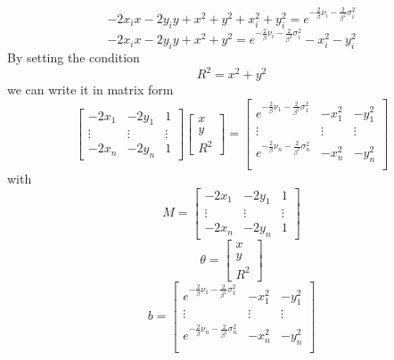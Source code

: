 \documentclass[12pt,twoside]{report}
\begin{document}
\begin{equation}
    -2x_ix-2y_iy+x^2+y^2+x_i^2+y_i^2=e^{-\frac{2}{\beta}\nu_i-\frac{2}{\beta^2}\sigma^2_i}
\end{equation}
\begin{equation}
    -2x_ix-2y_iy+x^2+y^2=e^{-\frac{2}{\beta}\nu_i-\frac{2}{\beta^2}\sigma^2_i}-x_i^2-y_i^2
\end{equation}
By setting the condition 
\begin{equation}
R^2=x^2+y^2    
\label{eq:10}
\end{equation}
we can write it in matrix form
\begin{equation}
    \begin{bmatrix}
        -2x_1 & -2y_1 & 1\\
        \vdots&\vdots&\vdots\\
        -2x_n & -2y_n & 1
    \end{bmatrix}
    \begin{bmatrix}
        x\\
        y\\
        R^2
    \end{bmatrix} = 
    \begin{bmatrix}
       e^{-\frac{2}{\beta}\nu_1-\frac{2}{\beta^2}\sigma^2_1} & -x_1^2 & -y_1^2\\
        \vdots&\vdots&\vdots\\
        e^{-\frac{2}{\beta}\nu_n-\frac{2}{\beta^2}\sigma^2_n} & -x_n^2 & -y_n^2\\
    \end{bmatrix}
\end{equation}
with $$M=\begin{bmatrix}
        -2x_1 & -2y_1 & 1\\
        \vdots&\vdots&\vdots\\
        -2x_n & -2y_n & 1
    \end{bmatrix}$$
$$\theta =     \begin{bmatrix}
        x\\
        y\\
        R^2
    \end{bmatrix}$$
$$b=    \begin{bmatrix}
        e^{-\frac{2}{\beta}\nu_1-\frac{2}{\beta^2}\sigma^2_1} & -x_1^2 & -y_1^2\\
        \vdots&\vdots&\vdots\\
        e^{-\frac{2}{\beta}\nu_n-\frac{2}{\beta^2}\sigma^2_n} & -x_n^2 & -y_n^2\\
    \end{bmatrix}$$
\end{document}
